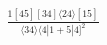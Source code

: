 \documentclass[varwidth, border=5pt]{standalone}
\begin{document}
\begin{my}
$\begin{gathered}
\scriptscriptstyle\frac{1[45][34]⟨24⟩[15]}{⟨34⟩⟨4|1+5|4]^2}
\end{gathered}$
\end{my}
\end{document}
